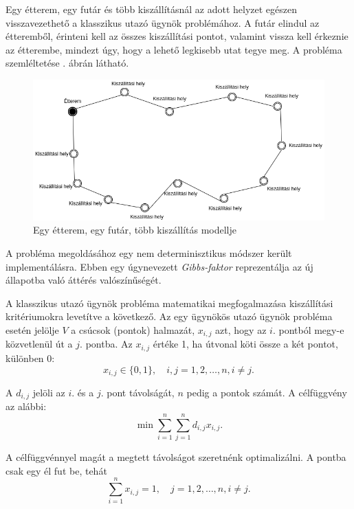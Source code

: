 

Egy étterem, egy futár és több kiszállításnál az adott helyzet egészen visszavezethető a klasszikus utazó ügynök problémához.
A futár elindul az étteremből, érinteni kell az összes kiszállítási pontot, valamint vissza kell érkeznie az étterembe, mindezt úgy, hogy a lehető legkisebb utat tegye meg.
A probléma szemléltetése . ábrán látható.\cite{Diagrams.net}

\begin{figure}[h!]
\centering
\includegraphics[scale=0.5]{images/Simpletsp.png}
\caption{Egy étterem, egy futár, több kiszállítás modellje}
\label{fig:model2}
\end{figure}


A probléma megoldásához egy nem determinisztikus módszer került implementálásra.
Ebben egy úgynevezett \textit{Gibbs-faktor} reprezentálja az új állapotba való áttérés valószí\-nű\-ségét.\cite{GibbsFactor}

A klasszikus utazó ügynök probléma matematikai megfogalmazása kiszállítási krité\-riumokra levetítve a következő.
Az egy ügynökös utazó ügynök probléma esetén jelölje $V$ a csúcsok (pontok) halmazát, $x_{i,j}$ azt, hogy az $i.$ pontból megy-e közvetlenül út a $j.$ pontba. Az $x_{i,j}$ értéke 1, ha útvonal köti össze a két pontot, különben 0: \cite{TSP}
\[
x_{i, j} \in \{0, 1\}, \quad i, j = 1, 2, \ldots, n, i \neq j.
\]

A $d_{i,j}$ jelöli az $i.$ és a $j.$ pont távolságát, $n$ pedig a pontok számát. A célfüggvény az alábbi:
\[
\displaystyle
\min \sum_{i=1}^n \sum_{j=1}^n d_{i,j} x_{i,j}.
\]

A célfüggvénnyel magát a megtett távolságot szeretnénk optimalizálni. A pontba csak egy él fut be, tehát
\[
\displaystyle
\sum_{i=1}^n x_{i,j} = 1, \quad j = 1, 2, \ldots, n, i \neq j.
\]

